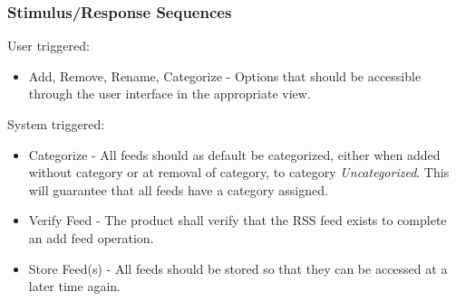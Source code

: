 \subsubsection{Stimulus/Response Sequences}
User triggered:
\begin{itemize}
  \item Add, Remove, Rename, Categorize - Options that should be accessible through the user interface in the appropriate view.
\end{itemize}
System triggered:
\begin{itemize}
  \item Categorize - All feeds should as default be categorized, either when added without category or at removal of category, to category \textit{Uncategorized}. This will guarantee that all feeds have a category assigned.
  \item Verify Feed - The product shall verify that the RSS feed exists to complete an add feed operation.
  \item Store Feed(s) - All feeds should be stored so that they can be accessed at a later time again.
\end{itemize}